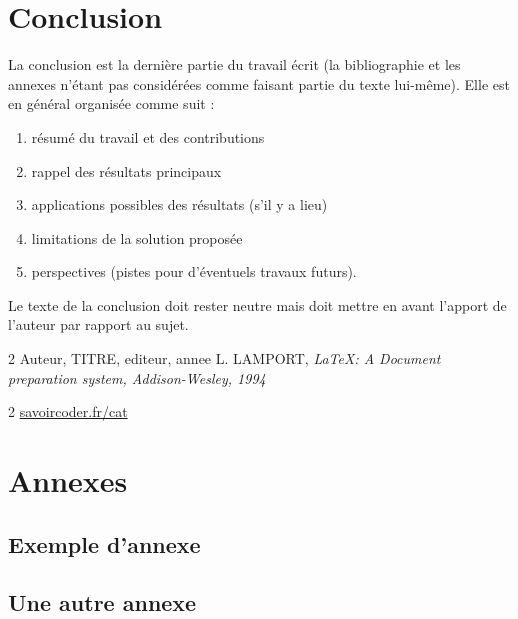 \documentclass[a4paper, 12pt, twoside]{report}
\begin{document}
\chapter{Conclusion}
La conclusion est la dernière partie du travail écrit (la bibliographie et les annexes n’étant pas considérées comme faisant partie du texte lui-même). Elle est en général organisée comme suit :
            \begin{center}
            \begin{enumerate}
                \item résumé du travail et des contributions
                \item rappel des résultats principaux
                \item applications possibles des résultats (s’il y a lieu)
                \item limitations de la solution proposée
                \item perspectives (pistes pour d’éventuels travaux futurs).
            \end{enumerate}
   \end{center}
Le texte de la conclusion doit rester neutre mais doit mettre en avant l’apport de l’auteur par rapport au sujet.


\renewcommand{\bibname}{Bibliographie}
\renewcommand{\bibname}{}
\begin{thebibliography}{2}
    Auteur, TITRE, editeur, annee
    L. LAMPORT, {\it \LaTeX : A Document preparation system, Addison-Wesley, 1994}
\end{thebibliography}

\renewcommand{\bibname}{Webographie}
\begin{thebibliography}{2}
    \url{savoircoder.fr/cat}
\end{thebibliography}

\chapter{Annexes}
\appendix
\makeatletter
\def\@seccntformat#1{Annexe~\csname the#1\endcsname:\quad}
\makeatother
	\section{Exemple d'annexe}
	\section{Une autre annexe}
\end{document}
